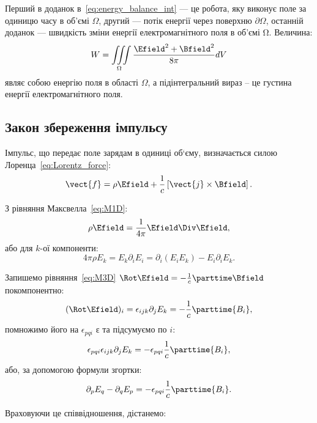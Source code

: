 Перший в доданок в~\eqref{eq:energy_balance_int} --- це робота, яку виконує поле за одиницю часу
в об’ємі $\Omega$, другий --- потік енергії через поверхню $\partial\Omega$, останній доданок ---
швидкість зміни енергії електромагнітного поля в об’ємі Ω. Величина:
\begin{equation}
	W = \iiint\limits_{\Omega}     \frac{\Efield^2 + \Bfield^2}{8\pi} dV
\end{equation}
являє собою енергію поля в області $\Omega$, а підінтегральний вираз – це густина енергії електромагнітного поля.


\subsection*{Закон збереження імпульсу}

Імпульс, що передає поле зарядам в одиниці об`єму, визначається силою
Лоренца~\eqref{eq:Lorentz_force}:
\begin{equation*}
	\vect{f} = \rho\Efield + \frac1c\left[\vect{j}\times\Bfield\right].
\end{equation*}

З рівняння Максвелла~\eqref{eq:M1D}:
\begin{equation*}
	\rho\Efield = \frac1{4\pi}\Efield\Div\Efield,
\end{equation*}
або для $k$-ої компоненти:
\begin{equation*}
	4\pi\rho E_k = E_k\partial_iE_i = \partial_i(E_iE_k) - E_i \partial_iE_k.
\end{equation*}

Запишемо рівняння~\eqref{eq:M3D} $\Rot\Efield = - \frac1c \parttime\Bfield$ покомпонентно:
\begin{equation*}
	(\Rot\Efield)_i = \epsilon_{ijk}\partial_j E_k = - \frac1c \parttime{B_i},
\end{equation*}
помножимо його на $\epsilon_{pqi}$ ε та підсумуємо по $i$:
\begin{equation*}
	\epsilon_{pqi}\epsilon_{ijk}\partial_j E_k = - \epsilon_{pqi}  \frac1c \parttime{B_i},
\end{equation*}
або, за допомогою формули згортки:
\begin{equation*}
	\partial_pE_q -  \partial_qE_p = - \epsilon_{pqi}  \frac1c \parttime{B_i}.
\end{equation*}

Враховуючи це співвідношення, дістанемо:

